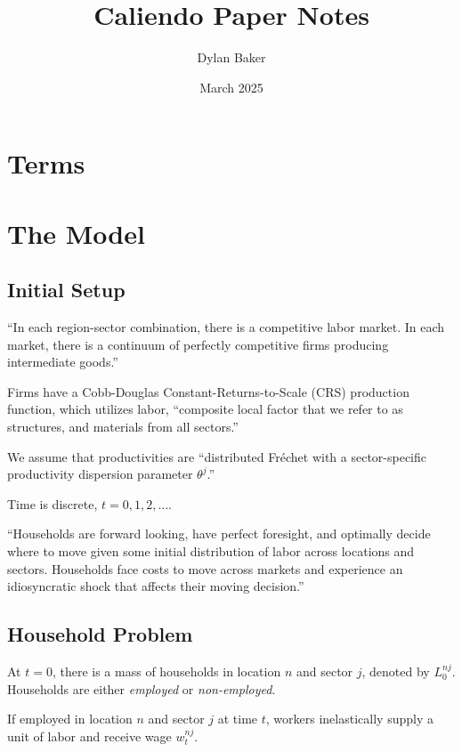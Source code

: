 \documentclass[10pt]{article}
\title{Caliendo Paper Notes}
\author{Dylan Baker}
\date{March 2025}
\begin{document}
\maketitle

\tableofcontents

\section{Terms}



\section{The Model}

\subsection{Initial Setup}


``In each region-sector combination,
there is a competitive labor market. 
In each market, there is a continuum of perfectly
competitive firms producing intermediate goods.''

Firms have a Cobb-Douglas Constant-Returns-to-Scale (CRS)
production function, which utilizes labor, 
``composite local factor that we refer to as structures, 
and materials from all sectors.''

We assume that productivities 
are 
``distributed Fréchet with a sector-specific
productivity dispersion parameter $\theta^j$.''

Time is discrete, $t=0,1,2, \ldots$.

``Households are forward looking,
have perfect foresight, and optimally decide where to 
move given some initial distribution of labor 
across locations and sectors.
Households face costs to move across markets
and experience an idiosyncratic shock that affects their moving decision.''

\subsection{Household Problem}

At $t=0$, there is a mass of households 
in location $n$ and sector $j$, denoted by $L_0^{n j}$.
Households are either \emph{employed} or 
\emph{non-employed}.

If employed in location $n$ and sector $j$ at time $t$, 
workers inelastically supply a unit of labor 
and receive wage $w_t^{n j}$.
\end{document}
